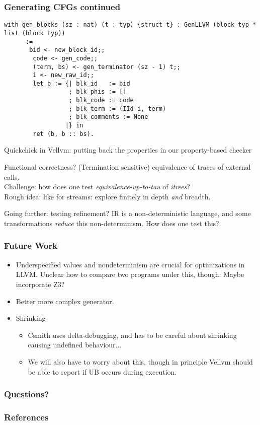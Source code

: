 \documentclass{beamer}
\begin{document}
\begin{frame}[fragile]
  \frametitle{Generating CFGs continued}
\begin{lstlisting}[language=SSR]
  with gen_blocks (sz : nat) (t : typ) {struct t} : GenLLVM (block typ * list (block typ))
      :=
       bid <- new_block_id;;
        code <- gen_code;;
        (term, bs) <- gen_terminator (sz - 1) t;;
        i <- new_raw_id;;
        let b := {| blk_id   := bid
                  ; blk_phis := []
                  ; blk_code := code
                  ; blk_term := (IId i, term)
                  ; blk_comments := None
                 |} in
        ret (b, b :: bs).
\end{lstlisting}
\end{frame}

\begin{frame}{Quickchick in Vellvm: putting back the properties in our property-based checker}
  \begin{block}{Functional correctness?}
    (Termination sensitive) equivalence of traces of external calls.\\
    Challenge: how does one test \emph{equivalence-up-to-tau} of \emph{itrees}?\\
    Rough idea: like for streams: explore finitely in depth \emph{and} breadth.
  \end{block}

  \begin{block}{Going further: testing refinement?}
    IR is a non-deterministic language, and some transformations \emph{reduce} this non-determinism. How does one test this? 
  \end{block}

\end{frame}

\begin{frame}
  \frametitle{Future Work}

  \begin{itemize}
  \item Underspecified values and nondeterminism are crucial for
    optimizations in LLVM. Unclear how to compare two programs under
    this, though. Maybe incorporate Z3?
  \item Better more complex generator.
  \item Shrinking
    \begin{itemize}
    \item Csmith uses delta-debugging, and has to be careful about
      shrinking causing undefined behaviour...
    \item We will also have to worry about this, though in principle
      Vellvm should be able to report if UB occurs during execution.
    \end{itemize}
  \end{itemize}
\end{frame}

\begin{frame}
  \frametitle{Questions?}

\end{frame}

\begin{frame}
  \frametitle{References}

  \nocite{*}
  \printbibliography
\end{frame}
\end{document}
